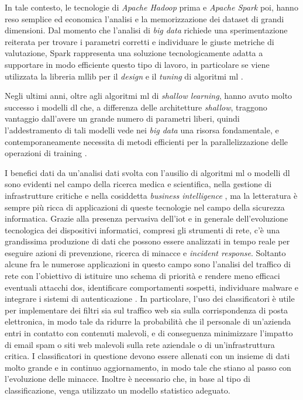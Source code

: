 \documentclass[12pt,a4paper,fleqn,titlepage]{report}
\newcommand\bd{\emph{\gls{big data}} }
\begin{document}
    In tale contesto, le tecnologie di \emph{Apache Hadoop} prima e \emph{Apache Spark} poi, hanno reso semplice ed economica l'analisi e la memorizzazione dei dataset di grandi dimensioni. Dal momento che l'analisi di \bd richiede una sperimentazione reiterata per trovare i parametri corretti e individuare le giuste metriche di valutazione, Spark rappresenta una soluzione tecnologicamente adatta a supportare in modo efficiente questo tipo di lavoro, in particolare se viene utilizzata la libreria \gls{mllib} per il \textit{design} e il \textit{tuning} di algoritmi \gls{ml} \cite{salloum:2016}.

    Negli ultimi anni, oltre agli algoritmi \gls{ml} di \textit{shallow learning}, hanno avuto molto successo i modelli \gls{dl} che, a differenza delle architetture \textit{shallow}, traggono vantaggio dall'avere un grande numero di parametri liberi, quindi l'addestramento di tali modelli vede nei \bd una risorsa fondamentale, e contemporaneamente necessita di metodi efficienti per la parallelizzazione delle operazioni di training \cite{xue-wenchen:2014}.

    I benefici dati da un'analisi dati svolta con l'ausilio di algoritmi \gls{ml} o modelli \gls{dl} sono evidenti nel campo della ricerca medica e scientifica, nella gestione di infrastrutture critiche e nella cosiddetta \emph{business intelligence} \cite{bharadiya:2023}, ma la letteratura è sempre più ricca di applicazioni di queste tecnologie nel campo della sicurezza informatica. Grazie alla presenza pervasiva dell'\gls{iot} e in generale dell'evoluzione tecnologica dei dispositivi informatici, compresi gli strumenti di rete, c'è una grandissima produzione di dati che possono essere analizzati in tempo reale per eseguire azioni di prevenzione, ricerca di minacce e \textit{incident response}. Soltanto alcune fra le numerose applicazioni in questo campo sono l'analisi del traffico di rete con l'obiettivo di istituire uno schema di priorità e rendere meno efficaci eventuali attacchi \gls{dos}, identificare comportamenti sospetti, individuare malware e integrare i sistemi di autenticazione \cite{sarker:2023}. In particolare, l'uso dei classificatori è utile per implementare dei filtri sia sul traffico web sia sulla corrispondenza di posta elettronica, in modo tale da ridurre la probabilità che il personale di un'azienda entri in contatto con contenuti malevoli, e di conseguenza minimizzare l'impatto di email spam o siti web malevoli sulla rete aziendale o di un'infrastruttura critica. I classificatori in questione devono essere allenati con un insieme di dati molto grande e in continuo aggiornamento, in modo tale che stiano al passo con l'evoluzione delle minacce. Inoltre è necessario che, in base al tipo di classificazione, venga utilizzato un modello statistico adeguato.
\end{document}
